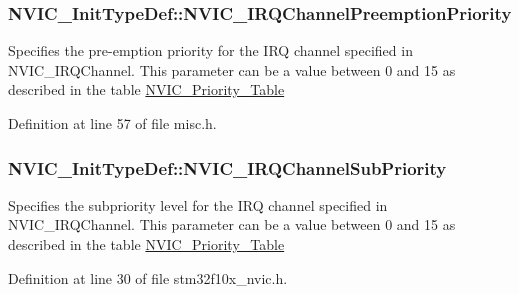 \subsubsection[{\texorpdfstring{N\+V\+I\+C\+\_\+\+I\+R\+Q\+Channel\+Preemption\+Priority}{NVIC_IRQChannelPreemptionPriority}}]{ N\+V\+I\+C\+\_\+\+Init\+Type\+Def\+::\+N\+V\+I\+C\+\_\+\+I\+R\+Q\+Channel\+Preemption\+Priority}\hypertarget{struct_n_v_i_c___init_type_def_aa3fe262c30188404a6e31f922c5ae513}{}\label{struct_n_v_i_c___init_type_def_aa3fe262c30188404a6e31f922c5ae513}
Specifies the pre-\/emption priority for the I\+RQ channel specified in N\+V\+I\+C\+\_\+\+I\+R\+Q\+Channel. This parameter can be a value between 0 and 15 as described in the table \hyperlink{group___n_v_i_c___priority___table}{N\+V\+I\+C\+\_\+\+Priority\+\_\+\+Table} 

Definition at line 57 of file misc.\+h.

\subsubsection[{\texorpdfstring{N\+V\+I\+C\+\_\+\+I\+R\+Q\+Channel\+Sub\+Priority}{NVIC_IRQChannelSubPriority}}]{ N\+V\+I\+C\+\_\+\+Init\+Type\+Def\+::\+N\+V\+I\+C\+\_\+\+I\+R\+Q\+Channel\+Sub\+Priority}\hypertarget{struct_n_v_i_c___init_type_def_a0d908a33a2250776d6016117a3b874aa}{}\label{struct_n_v_i_c___init_type_def_a0d908a33a2250776d6016117a3b874aa}
Specifies the subpriority level for the I\+RQ channel specified in N\+V\+I\+C\+\_\+\+I\+R\+Q\+Channel. This parameter can be a value between 0 and 15 as described in the table \hyperlink{group___n_v_i_c___priority___table}{N\+V\+I\+C\+\_\+\+Priority\+\_\+\+Table} 

Definition at line 30 of file stm32f10x\+\_\+nvic.\+h.

